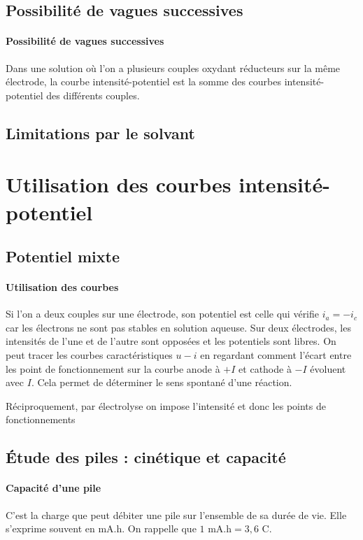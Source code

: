 \documentclass[french]{book}
\theoremstyle{plain}
\theoremstyle{definition}
\theoremstyle{remark}
\begin{document}
\subsection{Possibilité de vagues successives}

\paragraph{Possibilité de vagues successives} Dans une solution où l’on a plusieurs couples oxydant réducteurs sur la même électrode, la courbe intensité-potentiel est la somme des courbes intensité-potentiel des différents couples.

\subsection{Limitations par le solvant}

\section{Utilisation des courbes intensité-potentiel}
\subsection{Potentiel mixte}

\paragraph{Utilisation des courbes} Si l’on a deux couples sur une électrode, son potentiel est celle qui vérifie $i_a=-i_c$ car les électrons ne sont pas stables en solution aqueuse. Sur deux électrodes, les intensités de l’une et de l’autre sont opposées et les potentiels sont libres. On peut tracer les courbes caractéristiques $u-i$ en regardant comment l’écart entre les point de fonctionnement sur la courbe
anode à $+I$ et cathode à $-I$ évoluent avec $I$. Cela permet de déterminer le sens spontané d’une réaction. \par Réciproquement, par électrolyse on impose l’intensité et donc les points de fonctionnements

\subsection{Étude des piles : cinétique et capacité}

\paragraph{Capacité d'une pile} C'est la charge que peut débiter une pile sur l'ensemble de sa durée de vie. Elle s'exprime souvent en mA.h. On rappelle que $1$ mA.h$=3,6$ C.
\end{document}
